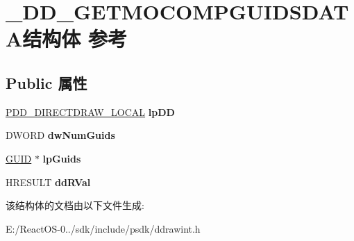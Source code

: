 \hypertarget{struct___d_d___g_e_t_m_o_c_o_m_p_g_u_i_d_s_d_a_t_a}{}\section{\+\_\+\+D\+D\+\_\+\+G\+E\+T\+M\+O\+C\+O\+M\+P\+G\+U\+I\+D\+S\+D\+A\+T\+A结构体 参考}
\label{struct___d_d___g_e_t_m_o_c_o_m_p_g_u_i_d_s_d_a_t_a}
\subsection*{Public 属性}
\begin{DoxyCompactItemize}
\item 
\mbox{\label{struct___d_d___g_e_t_m_o_c_o_m_p_g_u_i_d_s_d_a_t_a_aecb1284ad76044db79e7979907a709e3}} 
\hyperlink{struct___d_d___d_i_r_e_c_t_d_r_a_w___l_o_c_a_l}{P\+D\+D\+\_\+\+D\+I\+R\+E\+C\+T\+D\+R\+A\+W\+\_\+\+L\+O\+C\+AL} {\bfseries lp\+DD}
\item 
\mbox{\label{struct___d_d___g_e_t_m_o_c_o_m_p_g_u_i_d_s_d_a_t_a_a7d5d9d9c982727592d012d4bc1274ba6}} 
D\+W\+O\+RD {\bfseries dw\+Num\+Guids}
\item 
\mbox{\label{struct___d_d___g_e_t_m_o_c_o_m_p_g_u_i_d_s_d_a_t_a_a665ec91999bb555c034fd0ae54265e3f}} 
\hyperlink{interface_g_u_i_d}{G\+U\+ID} $\ast$ {\bfseries lp\+Guids}
\item 
\mbox{\label{struct___d_d___g_e_t_m_o_c_o_m_p_g_u_i_d_s_d_a_t_a_aafb482d9ef4d0420ce686a990e129cc3}} 
H\+R\+E\+S\+U\+LT {\bfseries dd\+R\+Val}
\end{DoxyCompactItemize}


该结构体的文档由以下文件生成\+:\begin{DoxyCompactItemize}
\item 
E\+:/\+React\+O\+S-\/0../sdk/include/psdk/ddrawint.\+h\end{DoxyCompactItemize}
